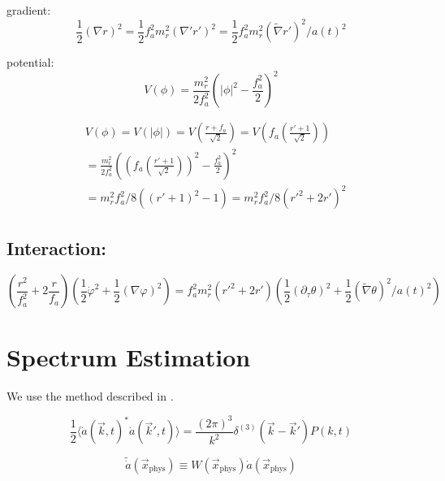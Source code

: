 \documentclass[a4paper]{article}
\begin{document}
gradient:
\begin{equation}
    \frac{1}{2} (\nabla r)^2 = \frac{1}{2} f_a^2 m_r^2 ( \nabla' r')^2
    = \frac{1}{2} f_a^2 m_r^2 ( \tilde{\nabla} r')^2 / a(t)^2
\end{equation}

potential:
\begin{equation}
    V(\phi) = \frac{m_r^2}{2 f_a^2}\left( |\phi|^2 - \frac{f_a^2}{2} \right)^2
\end{equation}

\begin{align}
    &V(\phi) = V(|\phi|) = V(\frac{r + f_a}{\sqrt{2}})
    = V \left(f_a \left( \frac{r' + 1}{\sqrt{2}} \right) \right) \\
    &= \frac{m_r^2}{2 f_a^2}\left( \left(f_a \left( \frac{r' + 1}{\sqrt{2}} \right) \right)^2 - \frac{f_a^2}{2} \right)^2 \\
    &= m_r^2 f_a^2 / 8 ( (r' + 1)^2 - 1)
    = m_r^2 f_a^2 / 8 ( r'^2 + 2 r' )^2
\end{align}

\subsection{Interaction:}
\begin{equation}
\left( \frac{r^2}{f_a^2} + 2 \frac{r}{f_a} \right) \left( \frac{1}{2} \dot{\varphi}^2 + \frac{1}{2} (\nabla \varphi)^2 \right)
= f_a^2 m_r^2 (r'^2 + 2 r') \left( \frac{1}{2} (\partial_\tau \theta )^2 + \frac{1}{2} (\tilde{\nabla} \theta)^2 / a(t)^2 \right)
\end{equation}

\newpage
\section{Spectrum Estimation}


We use the method described in \cite[sec. 3.2]{improved_estimation_hiramatsu}.

\begin{equation}
    \frac{1}{2} \langle \dot{a}(\vec{k}, t)^* \dot{a}(\vec{k}', t) \rangle = \frac{(2\pi)^3}{k^2} \delta^{(3)}(\vec{k} - \vec{k}') P(k, t)
\end{equation}

\begin{equation}
    \tilde{\dot{a}}(\vec{x}_\mathrm{phys}) \equiv W(\vec{x}_\mathrm{phys}) \dot{a}(\vec{x}_\mathrm{phys})
\end{equation}
\end{document}
